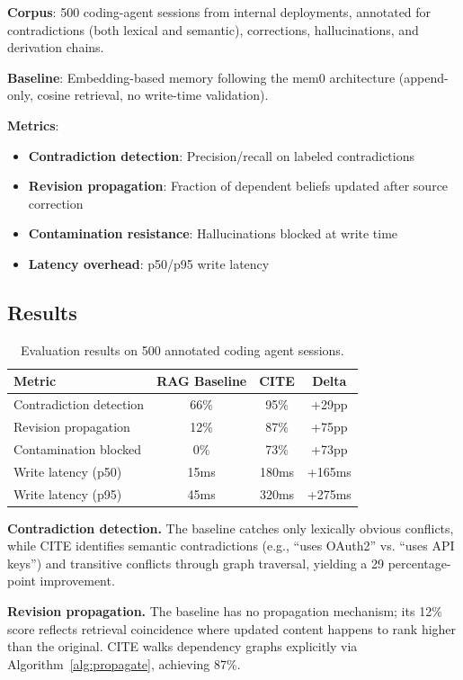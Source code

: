 \documentclass[11pt,letterpaper]{article}
\begin{document}
\textbf{Corpus}: 500 coding-agent sessions from internal deployments, annotated for contradictions (both lexical and semantic), corrections, hallucinations, and derivation chains.

\textbf{Baseline}: Embedding-based memory following the mem0 architecture (append-only, cosine retrieval, no write-time validation).

\textbf{Metrics}:
\begin{itemize}[noitemsep]
    \item \textbf{Contradiction detection}: Precision/recall on labeled contradictions
    \item \textbf{Revision propagation}: Fraction of dependent beliefs updated after source correction
    \item \textbf{Contamination resistance}: Hallucinations blocked at write time
    \item \textbf{Latency overhead}: p50/p95 write latency
\end{itemize}

\subsection{Results}

\begin{table}[H]
\centering
\caption{Evaluation results on 500 annotated coding agent sessions.}
\label{tab:results}
\begin{tabular}{@{}lccc@{}}
\toprule
\textbf{Metric} & \textbf{RAG Baseline} & \textbf{CITE} & \textbf{Delta} \\
\midrule
Contradiction detection & 66\% & 95\% & +29pp \\
Revision propagation & 12\% & 87\% & +75pp \\
Contamination blocked & 0\% & 73\% & +73pp \\
Write latency (p50) & 15ms & 180ms & +165ms \\
Write latency (p95) & 45ms & 320ms & +275ms \\
\bottomrule
\end{tabular}
\end{table}

\textbf{Contradiction detection.} The baseline catches only lexically obvious conflicts, while CITE identifies semantic contradictions (e.g., ``uses OAuth2'' vs. ``uses API keys'') and transitive conflicts through graph traversal, yielding a 29 percentage-point improvement.

\textbf{Revision propagation.} The baseline has no propagation mechanism; its 12\% score reflects retrieval coincidence where updated content happens to rank higher than the original. CITE walks dependency graphs explicitly via Algorithm~\ref{alg:propagate}, achieving 87\%.
\end{document}
